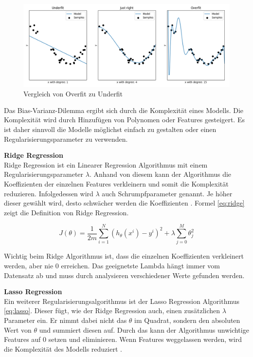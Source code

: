 \begin{figure}[ht]
\centering
\includegraphics[width=\textwidth]{images/overfit_underfit.png}
\caption[Vergleich von Overfit zu Underfit]{Vergleich von Overfit zu Underfit}
\label{fig:under_overfit}
\end{figure}

Das Bias-Varianz-Dilemma ergibt sich durch die Komplexität eines Modells. Die Komplexität wird durch Hinzufügen von Polynomen oder Features gesteigert.
Es ist daher sinnvoll die Modelle möglichst einfach zu gestalten oder einen Regularisierungsparameter zu verwenden.

\textbf{Ridge Regression}\\
Ridge Regression ist ein Linearer Regression Algorithmus mit einem Regularisierungsparameter $\lambda$. Anhand von diesem kann der Algorithmus die Koeffizienten der einzelnen Features verkleinern und somit die Komplexität reduzieren. Infolgedessen wird $\lambda$ auch Schrumpfparameter genannt. Je höher dieser gewählt wird, desto schwächer werden die Koeffizienten \cite{ridge, ridge_2}. Formel \eqref{eq:ridge} zeigt die Definition von Ridge Regression.

\begin{equation}
\label{eq:ridge}
J(\theta) = \frac{1}{2m} \sum_{i=1}^{N} (h_\theta(x^i) - y^i)^2 + \lambda \sum_{j=0}^{M} \theta_{j}^{2}
\end{equation}

Wichtig beim Ridge Algorithmus ist, dass die einzelnen Koeffizienten verkleinert werden, aber nie 0 erreichen. Das geeignetste Lambda hängt immer vom Datensatz ab und muss durch analysieren verschiedener Werte gefunden werden.

\textbf{Lasso Regression}\\
Ein weiterer Regularisierungsalgorithmus ist der Lasso Regression Algorithmus \eqref{eq:lasso}. Dieser fügt, wie der Ridge Regression auch, einen zusätzlichen $\lambda$ Parameter ein. Er nimmt dabei nicht das $\theta$ im Quadrat, sondern den absoluten Wert von $\theta$ und summiert diesen auf. Durch das kann der Algorithmus unwichtige Features auf 0 setzen und eliminieren. Wenn Features weggelassen werden, wird die Komplexität des Modells reduziert \cite{lasso}.

